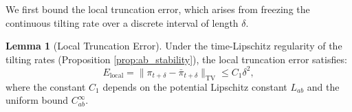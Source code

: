 \documentclass[11pt]{article}
\theoremstyle{definition}
\newtheorem{lemma}[theorem]{Lemma}
\numberwithin{equation}{section}%
\begin{document}
{%

We first bound the local truncation error, which arises from freezing the continuous tilting rate over a discrete interval of length $\delta$.

\begin{lemma}[Local Truncation Error]
\label{lem:local_error_tv}
Under the time-Lipschitz regularity of the tilting rates (Proposition \ref{prop:ab_stability}), the local truncation error satisfies:
\begin{equation}
E_{\mathrm{local}} = \|\pi_{t+\delta} - \bar{\pi}_{t+\delta}\|_{\mathrm{TV}} \le C_1 \delta^2,
\end{equation}
where the constant $C_1$ depends on the potential Lipschitz constant $L_{ab}$ and the uniform bound $C_{ab}^\infty$.
\end{lemma}


}
\end{document}
